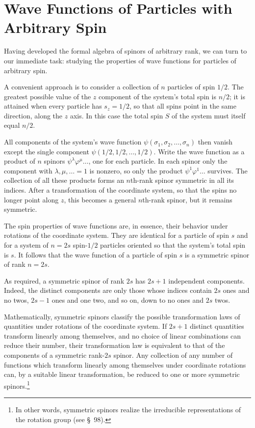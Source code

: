 \section{Wave Functions of Particles with Arbitrary Spin}

Having developed the formal algebra of spinors of arbitrary rank, we can turn
to our immediate task: studying the properties of wave functions for
particles of arbitrary spin.

A convenient approach is to consider a collection of $n$ particles of spin
$1/2$. The greatest possible value of the $z$ component of the system's total
spin is $n/2$; it is attained when every particle has $s_z=1/2$, so that all
spins point in the same direction, along the $z$ axis. In this case the total
spin $S$ of the system must itself equal $n/2$.

All components of the system's wave function
$\psi(\sigma_1,\sigma_2,\ldots,\sigma_n)$ then vanish except the single
component $\psi(1/2,1/2,\ldots,1/2)$. Write the wave function as a product of
$n$ spinors $\psi^\lambda\varphi^\mu\ldots$, one for each particle. In each
spinor only the component with $\lambda,\mu,\ldots=1$ is nonzero, so only the
product $\psi^1\varphi^1\ldots$ survives. The collection of all these products
forms an $n$th-rank spinor symmetric in all its indices. After a transformation
of the coordinate system, so that the spins no longer point along $z$, this
becomes a general $n$th-rank spinor, but it remains symmetric.

The spin properties of wave functions are, in essence, their behavior under
rotations of the coordinate system. They are identical for a particle of spin
$s$ and for a system of $n=2s$ spin-$1/2$ particles oriented so that the
system's total spin is $s$. It follows that the wave function of a particle of
spin $s$ is a symmetric spinor of rank $n=2s$.

As required, a symmetric spinor of rank $2s$ has $2s+1$ independent
components. Indeed, the distinct components are only those whose indices
contain $2s$ ones and no twos, $2s-1$ ones and one two, and so on, down to no
ones and $2s$ twos.

Mathematically, symmetric spinors classify the possible transformation laws
of quantities under rotations of the coordinate system. If $2s+1$ distinct
quantities transform linearly among themselves, and no choice of linear
combinations can reduce their number, their transformation law is equivalent
to that of the components of a symmetric rank-$2s$ spinor. Any collection of
any number of functions which transform linearly among themselves under
coordinate rotations can, by a suitable linear transformation, be reduced to
one or more symmetric spinors.\footnote{In other words, symmetric spinors
realize the irreducible representations of the rotation group (see \S~98).}

